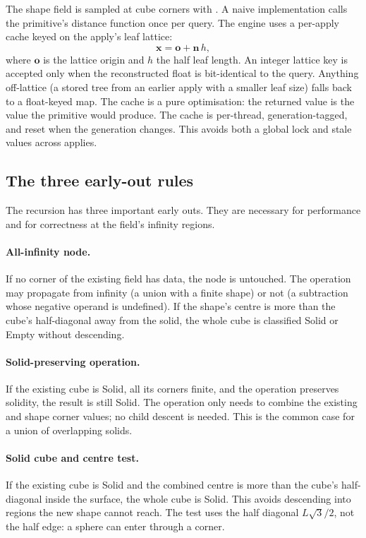 The shape field is sampled at cube corners with .  A
naive implementation calls the primitive's distance function once per
query.  The engine uses a per-apply cache keyed on the apply's leaf lattice:
\begin{equation}
  \mathbf{x} = \mathbf{o} + \mathbf{n}\,h,
\end{equation}
where $\mathbf{o}$ is the lattice origin and $h$ the half leaf length.
An integer lattice key is accepted only when the reconstructed float is
bit-identical to the query.  Anything off-lattice (a stored tree from an
earlier apply with a smaller leaf size) falls back to a float-keyed map.
The cache is a pure optimisation: the returned value is the value the
primitive would produce.  The cache is per-thread, generation-tagged, and
reset when the generation changes.  This avoids both a global lock and
stale values across applies.

\subsection{The three early-out rules}

The recursion has three important early outs.  They are necessary for
performance and for correctness at the field's infinity regions.

\paragraph{All-infinity node.}
If no corner of the existing field has data, the node is untouched.  The
operation may propagate from infinity (a union with a finite shape) or not
(a subtraction whose negative operand is undefined).  If the shape's
centre is more than the cube's half-diagonal away from the solid, the
whole cube is classified Solid or Empty without descending.

\paragraph{Solid-preserving operation.}
If the existing cube is Solid, all its corners finite, and the operation
preserves solidity, the result is still Solid.  The operation only needs
to combine the existing and shape corner values; no child descent is
needed.  This is the common case for a union of overlapping solids.

\paragraph{Solid cube and centre test.}
If the existing cube is Solid and the combined centre is more than the
cube's half-diagonal inside the surface, the whole cube is Solid.  This
avoids descending into regions the new shape cannot reach.  The test uses
the half diagonal $L\sqrt{3}/2$, not the half edge: a sphere can enter
through a corner.

